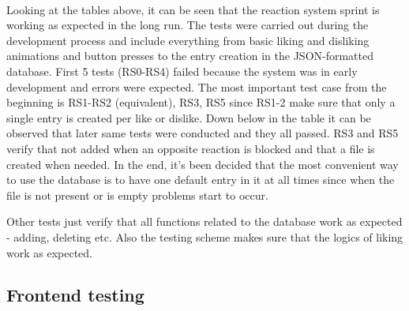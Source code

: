 \documentclass[12pt]{report}
\begin{document}
\begin{appendices}
\paragraph{}
Looking at the tables above, it can be seen that the reaction system sprint is working as expected in the long run.
The tests were carried out during the development process and include everything from basic liking and disliking animations
and button presses to the entry creation in the JSON-formatted database. First 5 tests (RS0-RS4) failed because the system was
in early development and errors were expected. The most important test case from the beginning is RS1-RS2 (equivalent), RS3, RS5
since RS1-2 make sure that only a single entry is created per like or dislike. Down below in the table it can be observed that later
same tests were conducted and they all passed. RS3 and RS5 verify that not added when an opposite reaction is blocked and
that a file is created when needed. In the end, it's been decided that the most convenient way to use the database is to have
one default entry in it at all times since when the file is not present or is empty problems start to occur.

Other tests just verify that all functions related to the database work as expected - adding, deleting etc. Also the
testing scheme makes sure that the logics of liking work as expected.

\clearpage


\subsection*{Frontend testing}
\label{appendix:frontend_testing}


\end{appendices}
\end{document}
